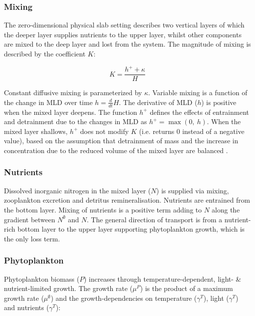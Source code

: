 \documentclass[template.tex]{subfiles}
\begin{document}


\subsubsection{Mixing}

The zero-dimensional physical slab setting describes two vertical layers of which the deeper layer supplies nutrients to the upper layer, whilst other components are mixed to the deep layer and lost from the system.
The magnitude of mixing is described by the coefficient $K$:

\begin{equation}
    K = \frac{h^{+} + \kappa}{H}
\end{equation}

Constant diffusive mixing is parameterized by $\kappa$. Variable mixing is a function of the change in MLD over time $h = \frac{d}{d t} H$. The derivative of MLD ($h$) is positive when the mixed layer deepens. The function $h^{+}$ defines the effects of entrainment and detrainment due to the changes in MLD as $h^{+} = \max(0, \ h)$. When the mixed layer shallows, $h^{+}$ does not modify $K$ (i.e. returns 0 instead of a negative value), based on the assumption that detrainment of mass and the increase in concentration due to the reduced volume of the mixed layer are balanced \citep{Evans1985ACycles}. \\

\subsubsection{Nutrients}
Dissolved inorganic nitrogen in the mixed layer ($N$) is supplied via mixing, zooplankton excretion and detritus remineralisation.
Nutrients are entrained from the bottom layer. Mixing of nutrients is a positive term adding to $N$ along the gradient between $N^\emptyset$ and $N$. The general direction of transport is from a nutrient-rich bottom layer to the upper layer supporting phytoplankton growth, which is the only loss term.

\subsubsection{Phytoplankton}
Phytoplankton biomass ($P$) increases through temperature-dependent, light- \& nutrient-limited growth. The growth rate ($\mu^{P}$) is the product of a maximum growth rate ($\mu^{\emptyset}$) and the growth-dependencies on temperature ($\gamma^{T}$), light ($\gamma^{T}$) and nutrients ($\gamma^{T}$): 
\end{document}
